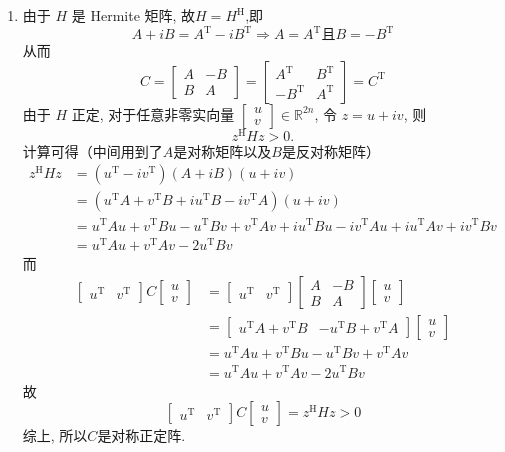 \documentclass[12pt, answers]{exam}     %
\newcommand{\T}{\mathrm{T}}
\newcommand{\HH}{\mathrm{H}}
\begin{document}
\begin{questions}
\begin{solution}
\begin{enumerate}[label=(\arabic*)]
\item 由于 \( H \) 是 Hermite 矩阵, 故\( H = H^{\HH} \),即 \[ A + iB = A^{\T} - iB^{\T} \Rightarrow A = A^{\T} \text{且} B = -B^{\T} \]
从而
\[
C = \begin{bmatrix} A & -B \\ B & A \end{bmatrix}
= \begin{bmatrix} A^{\T} & B^{\T} \\ -B^{\T} & A^{\T} \end{bmatrix} 
= C^{\T}
\]
由于 \( H \) 正定, 对于任意非零实向量 \( \begin{bmatrix} u \\ v \end{bmatrix} \in \mathbb{R}^{2n} \), 令 \( z = u + i v \), 则
\[
z^{\HH} H z > 0.
\]
计算可得（中间用到了$A$是对称矩阵以及$B$是反对称矩阵）
\begin{align*}
z^{\HH} H z &= (u^{\T} - i v^{\T}) (A + iB) (u + i v) \\
&= (u^{\T} A + v^{\T} B + iu^{\T} B - iv^{\T} A) (u + i v) \\  
&= u^{\T} A u + v^{\T} B u - u^{\T} B v + v^{\T} A v + iu^{\T} B u - iv^{\T} A u + iu^{\T} A v + iv^{\T} B v\\  
&= u^{\T} A u + v^{\T} A v - 2 u^{\T} B v
\end{align*}
而
\begin{align*}
\begin{bmatrix} u^{\T} & v^{\T} \end{bmatrix} C \begin{bmatrix} u \\ v \end{bmatrix} 
&= \begin{bmatrix} u^{\T} & v^{\T} \end{bmatrix} \begin{bmatrix} A & -B \\ B & A \end{bmatrix} \begin{bmatrix} u \\ v \end{bmatrix} \\
&= \begin{bmatrix} u^{\T} A + v^{\T} B & - u^{\T} B + v^{\T} A \end{bmatrix} \begin{bmatrix} u \\ v \end{bmatrix} \\       
&= u^{\T} A u + v^{\T} B u - u^{\T} B v + v^{\T} A v \\
&= u^{\T} A u + v^{\T} A v - 2 u^{\T} B v
\end{align*}
故
\[
\begin{bmatrix} u^{\T} & v^{\T} \end{bmatrix} C \begin{bmatrix} u \\ v \end{bmatrix} = z^{\HH} H z > 0
\]
综上, 所以$C$是对称正定阵.


\end{enumerate}
\end{solution}
\end{questions}
\end{document}
